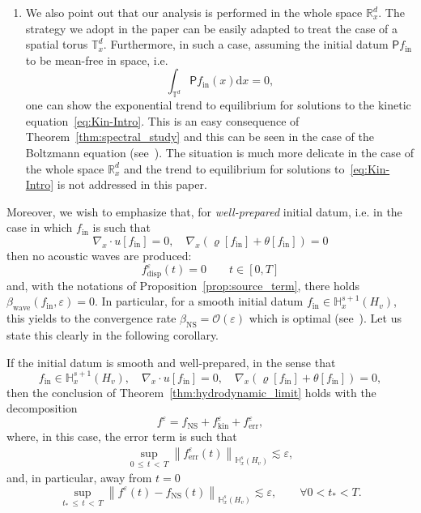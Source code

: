 \documentclass[10pt]{amsart}
\theoremstyle{definition}\newtheorem{defi}[theo]{Definition}\newtheorem{rema}[theo]{Remark}\newtheorem{exam}[theo]{Example}\newtheorem{exem}[theo]{Example}\newtheorem{nota}[theo]{Notation}
\newcommand{\ini}{\mathrm{in}}
\newcommand{\err}{\mathrm{err}}
\newcommand{\ns}{\mathrm{NS}}
\newcommand{\kin}{\mathrm{kin}}
\renewcommand{\d}{\mathrm{d}}
\newcommand{\Wave}{\mathrm{wave}}
\newcommand{\disp}{\mathrm{disp}}
\newcommand{\R}{\mathbb{R}}
\newcommand{\T}{\mathbb{T}}
\newcommand{\bbH}{\mathbb{H}}
\newcommand{\OO}{\mathcal{O}}
\newcommand{\PP}{\mathsf{P}}
\newcommand{\Ss}{H}
\renewcommand*\le{\leqslant}
\newcommand*\eps{{\varepsilon}}
\newcommand{\thttl}[1]{\emph{\textbf{#1}}}
\let\oldforall\forall
\renewcommand*{\forall}{\mathrel{\oldforall}}
\begin{document}
\begin{enumerate}
\item We also point out that our analysis is performed in the whole space $\R^{d}_{x}$. The strategy we adopt in the paper can be easily adapted to treat the case of a spatial torus $\T^{d}_{x}$. Furthermore, in such a case, assuming the initial datum $\PP f_\ini$ to be mean-free in space, i.e.
\[
\int_{\T^d} \PP f_\ini(x) \d x = 0,
\]
one can show the exponential trend to equilibrium for solutions to the kinetic equation~\eqref{eq:Kin-Intro}. This is an easy consequence of Theorem~\ref{thm:spectral_study} and this can be seen in the case of the Boltzmann equation (see~\cite{BMM2019,G2023, GMM2017,GT2020}). The situation is much more delicate in the case of the whole space $\R^{d}_{x}$ and the trend to equilibrium for solutions to~\eqref{eq:Kin-Intro} is not addressed in this paper.
\end{enumerate}
Moreover, we wish to emphasize that, for \emph{well-prepared} initial datum, i.e. in the case in which $f_{\ini}$ is such that
\[
\nabla_x\cdot u[f_\ini]=0, \quad \nabla_x\left(\varrho[f_\ini]+\theta[f_\ini]\right)=0
\]
then {no acoustic waves are produced:}
\[
f^\eps_\disp(t)=0 \qquad t \in [0,T]
\]
and, with the notations of Proposition~\ref{prop:source_term}, there holds $\beta_\Wave(f_\ini,\eps)=0$. In particular, for a smooth initial datum $f_\ini \in \bbH^{s+1}_x(\Ss_v)$, this yields to the convergence rate {$\beta_{\ns} = \OO(\eps)$} which is optimal (see~\cite{G2006}). Let us state this clearly in the following corollary.


\begin{coro}[\thttl{Optimal convergence rate}]
If the initial datum is smooth and well-prepared, in the sense that
\begin{equation}\label{eq:addi}
f_\ini \in \bbH^{s+1}_x \left(\Ss_v \right), \quad \nabla_x\cdot u[f_\ini]=0, \quad \nabla_x\left(\varrho[f_\ini]+\theta[f_\ini]\right)=0,
\end{equation}
then the conclusion of Theorem~\ref{thm:hydrodynamic_limit} holds with the decomposition
\[
f^\eps = f_\ns + f^\eps_\kin + f^\eps_\err,
\]
where, in this case, the error term is such that
\begin{gather*}
\sup_{0\,\le\,t\,<\,T} \left\| f^\eps_\err(t) \right\|_{ \bbH^s_x \left(\Ss_v \right) } \lesssim \eps,
\end{gather*}
and, in particular, away from $t=0$
\[
\sup_{t_*\,\le\,t\,<\,T} \left\| f^\eps(t) - f_\ns(t) \right\|_{ \bbH^s_x \left(\Ss_v \right) } \lesssim \eps, \qquad \forall 0 < t_* < T.
\]
\end{coro}
\end{document}
